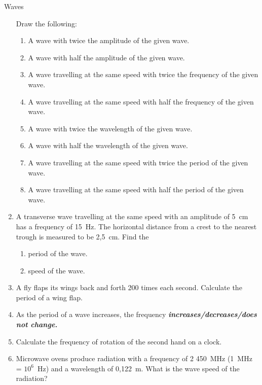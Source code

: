 \begin{definition}
\begin{exercises}{Waves }
\begin{enumerate}[noitemsep, label=\textbf{\arabic*}. ]
\begin{figure}[H]
 \end{figure}       
Draw the following:
\label{m38806*id320905}\begin{enumerate}[noitemsep, label=\textbf{\alph*}. ] 
            \label{m38806*uid39}\item A wave with twice the amplitude of the given wave.
\label{m38806*uid40}\item A wave with half the amplitude of the given wave.
\label{m38806*uid41}\item A wave travelling at the same speed with twice the frequency of the given wave.
\label{m38806*uid42}\item A wave travelling at the same speed with half the frequency of the given wave.
\label{m38806*uid43}\item A wave with twice the wavelength of the given wave.
\label{m38806*uid44}\item A wave with half the wavelength of the given wave.
\label{m38806*uid45}\item A wave travelling at the same speed with twice the period of the given wave.
\label{m38806*uid46}\item A wave travelling at the same speed with half the period of the given wave.
\end{enumerate}
                \label{m38806*uid47}\item A transverse wave travelling at the same speed with an amplitude of 5~cm has a frequency of 15~Hz. The horizontal distance from a crest to the nearest trough is measured to be 2,5~cm. Find the
\label{m38806*id321026}\begin{enumerate}[noitemsep, label=\textbf{\alph*}. ] 
            \label{m38806*uid48}\item period of the wave.
\label{m38806*uid49}\item speed of the wave.
\end{enumerate}
                \label{m38806*uid50}\item A fly flaps its wings back and forth 200 times each second. Calculate the period of a wing flap.\newline
\label{m38806*uid51}\item As the period of a wave increases, the frequency 
\textsl{\textbf{increases/decreases/does not change.}}\newline
\label{m38806*uid52}\item Calculate the frequency of rotation of the second hand on a clock.\newline
\label{m38806*uid53}\item Microwave ovens produce radiation with a frequency of 2 450~MHz (1~MHz = ${10}^{6}$~Hz) and a wavelength of 0,122~m. What is the wave speed of the radiation?\newline

\end{enumerate}
\end{exercises}
\end{definition}
